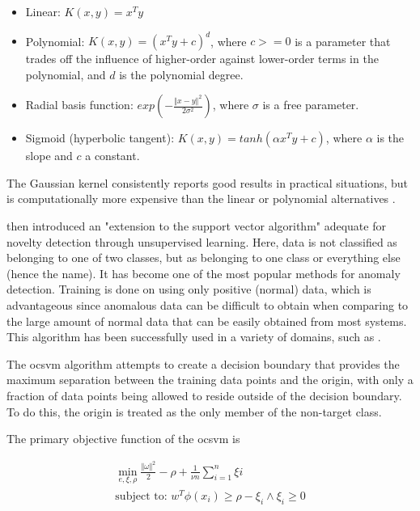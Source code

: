 \begin{itemize}
    \item Linear: $K(x, y) = x^Ty$
    \item Polynomial: $K(x, y) = (x^Ty + c)^d$, where $c>=0$  is a parameter that trades off the influence of higher-order against lower-order terms in the polynomial, and $d$ is the polynomial degree.
    \item Radial basis function: $exp(-\frac{\Vert x - y \Vert ^2}{2\sigma^2})$, where $\sigma$ is a free parameter.
    \item Sigmoid (hyperbolic tangent): $K(x, y) = tanh(\alpha x^Ty + c)$, where $\alpha$ is the slope and $c$ a constant.
\end{itemize}

The Gaussian kernel consistently reports good results in practical situations, but is computationally more expensive than the linear or polynomial alternatives \citep{bounsiar2014one}.\par

\cite{scholkopf1999} then introduced an "extension to the support vector algorithm" adequate for novelty detection through unsupervised learning. Here, data is not classified as belonging to one of two classes, but as belonging to one class or everything else (hence the name). It has become one of the most popular methods for anomaly detection. Training is done on using only positive (normal) data, which is advantageous since anomalous data can be difficult to obtain when comparing to the large amount of normal data that can be easily obtained from most systems. This algorithm has been successfully used in a variety of domains, such as \cite{tian2018ramp, miao2018distributed, amraee2018abnormal}.\par
The \gls{ocsvm} algorithm attempts to create a decision boundary that provides the maximum separation between the training data points and the origin, with only a fraction of data points being allowed to reside outside of the decision boundary. To do this, the origin is treated as the only member of the non-target class.\par
The primary objective function of the \gls{ocsvm} is

\begin{gather*}
\min_{e, \xi, \rho} \frac{\Vert \omega \Vert ^2}{2} - \rho + \frac{1}{\nu n} \sum_{i=1}^{n} \xi i \\ \text{subject to: } w^T \phi (x_i) \geq \rho - \xi_i \wedge \xi_i \geq 0
\end{gather*}

